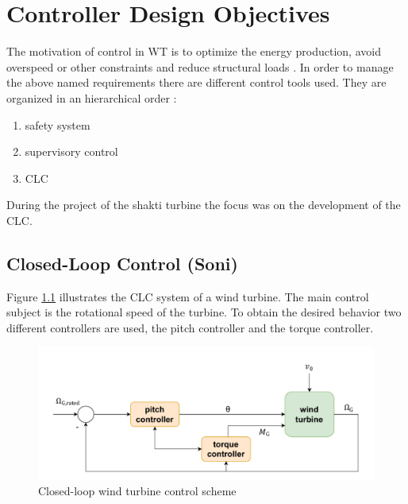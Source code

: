 \chapter{Controller Design Objectives} \label{chapter: controller design obj}
The motivation of control in \gls{WT} is to optimize the energy production, avoid overspeed or other constraints and reduce structural loads \cite{SchlipfLecture}.
In order to manage the above named requirements there are different control tools used.
They are organized in an hierarchical order \cite{WindEnergyHandbook}:
\begin{enumerate} 
	\item safety system
	\item supervisory control
	\item \gls{CLC}
\end{enumerate} 
During the project of the \gls{shakti} turbine the focus was on the development of the \gls{CLC}.
\section{Closed-Loop Control (Soni)} \label{Advanced controller}
Figure \ref{fig:Closed-loop Wind Turbine Control} illustrates the \gls{CLC} system of a wind turbine.
The main control subject is the rotational speed of the turbine.
To obtain the desired behavior two different controllers are used, the pitch controller and the torque controller.

\begin{figure}[h]
	\centering
	\includegraphics[width=\textwidth]{Figures/Control_loop}
	\caption{Closed-loop wind turbine control scheme}
	\label{fig:Closed-loop Wind Turbine Control}
\end{figure}

